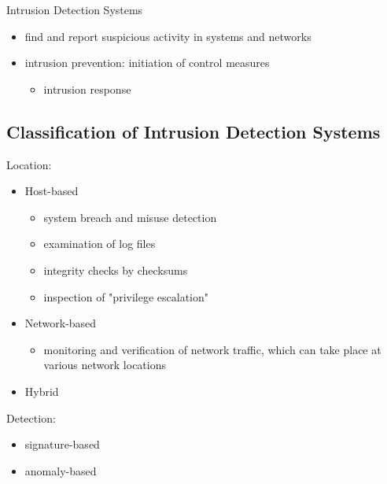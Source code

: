 \documentclass[11pt]{article}
\begin{document}
Intrusion Detection Systems
\begin{itemize}
\item find and report suspicious activity in systems and networks
\item intrusion prevention: initiation of control measures
\begin{itemize}
\item intrusion response
\end{itemize}
\end{itemize}

\subsection{Classification of Intrusion Detection Systems}
\label{sec:org19909ed}
Location:
\begin{itemize}
\item Host-based
\begin{itemize}
\item system breach and misuse detection
\item examination of log files
\item integrity checks by checksums
\item inspection of "privilege escalation"
\end{itemize}
\item Network-based
\begin{itemize}
\item monitoring and verification of network traffic, which can take place at various network locations
\end{itemize}
\item Hybrid
\end{itemize}

Detection:
\begin{itemize}
\item signature-based
\item anomaly-based
\end{itemize}
\end{document}
